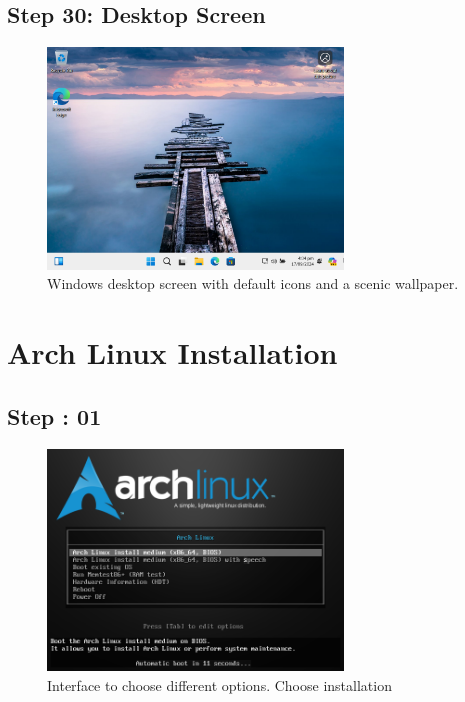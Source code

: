 \documentclass{article}
\begin{document}
\subsection{Step 30: Desktop Screen}
\begin{figure}[H]
    \centering
    \includegraphics[width=0.7\textwidth]{2024-09-17_16-04-55.png}
    \caption{Windows desktop screen with default icons and a scenic wallpaper.}
    \label{fig:desktop_screen}
\end{figure}

\section{Arch Linux Installation}
\subsection{Step : 01}
\begin{figure}[H]
    \centering
    \includegraphics[width=0.7\textwidth]{1.png}
    \caption{Interface to choose different options. Choose installation}
    \label{fig:install_Arch1}
\end{figure}
\end{document}
